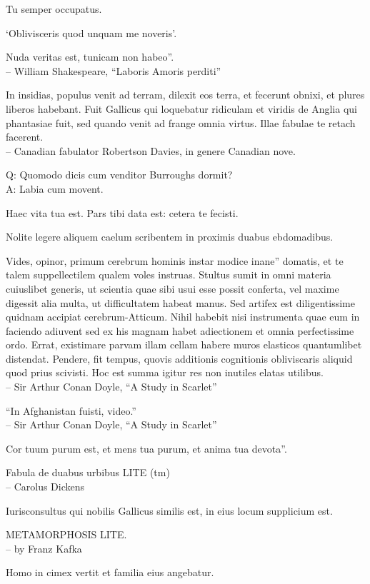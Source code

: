 \documentclass[titlepage,12pt]{memoir}
\begin{document}
Tu semper occupatus.

‘Oblivisceris quod unquam me noveris’.

Nuda veritas est, tunicam non habeo”.
\\-- William Shakespeare, “Laboris Amoris perditi”

In insidias, populus venit ad terram, dilexit eos terra, et fecerunt
obnixi, et plures liberos habebant. Fuit Gallicus qui loquebatur ridiculam
et viridis de Anglia qui phantasiae fuit, sed quando venit ad
frange omnia virtus. Illae fabulae te retach facerent.
\\-- Canadian fabulator Robertson Davies, in genere Canadian
nove.

Q: Quomodo dicis cum venditor Burroughs dormit?\\
A: Labia cum movent.

Haec vita tua est. Pars tibi data est: cetera te fecisti.

Nolite legere aliquem caelum scribentem in proximis duabus ebdomadibus.

Vides, opinor, primum cerebrum hominis instar modice inane”
domatis, et te talem suppellectilem qualem voles instruas. Stultus
sumit in omni materia cuiuslibet generis, ut scientia
quae sibi usui esse possit conferta, vel maxime digessit
alia multa, ut difficultatem habeat manus.
Sed artifex est diligentissime quidnam accipiat
cerebrum-Atticum. Nihil habebit nisi instrumenta quae eum in faciendo adiuvent
sed ex his magnam habet adiectionem et omnia perfectissime
ordo. Errat, existimare parvam illam cellam habere muros elasticos
quantumlibet distendat. Pendere, fit tempus, quovis
additionis cognitionis obliviscaris aliquid quod prius scivisti. Hoc est
summa igitur res non inutiles elatas
utilibus.
\\-- Sir Arthur Conan Doyle, “A Study in Scarlet”

 “In Afghanistan fuisti, video.”
\\-- Sir Arthur Conan Doyle, “A Study in Scarlet”

Cor tuum purum est, et mens tua purum, et anima tua devota”.

Fabula de duabus urbibus LITE (tm)
\\-- Carolus Dickens

Iurisconsultus qui nobilis Gallicus similis est, in eius locum supplicium est.

METAMORPHOSIS LITE.
\\-- by Franz Kafka

Homo in cimex vertit et familia eius angebatur.
\end{document}
